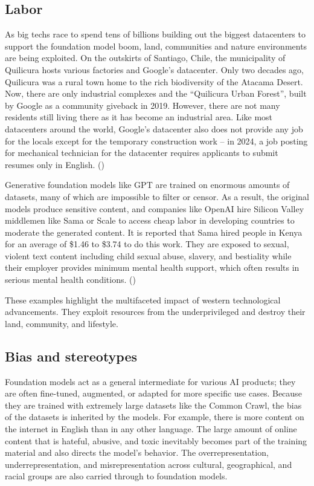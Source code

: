 \documentclass[12pt]{article}
\begin{document}
\subsection{Labor}
As big techs race to spend tens of billions building out the biggest datacenters to support the foundation model boom, land, communities and nature environments are being exploited. On the outskirts of Santiago, Chile, the municipality of Quilicura hosts various factories and Google's datacenter. Only two decades ago, Quilicura was a rural town home to the rich biodiversity of the Atacama Desert. Now, there are only industrial complexes and the ``Quilicura Urban Forest'', built by Google as a community giveback in 2019. However, there are not many residents still living there as it has become an industrial area. Like most datacenters around the world, Google's datacenter also does not provide any job for the locals except for the temporary construction work -- in 2024, a job posting for mechanical technician for the datacenter requires applicants to submit resumes only in English. (\cite{empire})

Generative foundation models like GPT are trained on enormous amounts of datasets, many of which are impossible to filter or censor. As a result, the original models produce sensitive content, and companies like OpenAI hire Silicon Valley middlemen like Sama or Scale to access cheap labor in developing countries to moderate the generated content. It is reported that Sama hired people in Kenya for an average of \$1.46 to \$3.74 to do this work. They are exposed to sexual, violent text content including child sexual abuse, slavery, and bestiality while their employer provides minimum mental health support, which often results in serious mental health conditions. (\cite{empire})

These examples highlight the multifaceted impact of western technological advancements. They exploit resources from the underprivileged and destroy their land, community, and lifestyle.

\subsection{Bias and stereotypes}
Foundation models act as a general intermediate for various AI products; they are often fine-tuned, augmented, or adapted for more specific use cases. Because they are trained with extremely large datasets like the Common Crawl, the bias of the datasets is inherited by the models. For example, there is more content on the internet in English than in any other language. The large amount of online content that is hateful, abusive, and toxic inevitably becomes part of the training material and also directs the model's behavior. The overrepresentation, underrepresentation, and misrepresentation across cultural, geographical, and racial groups are also carried through to foundation models.
\end{document}
